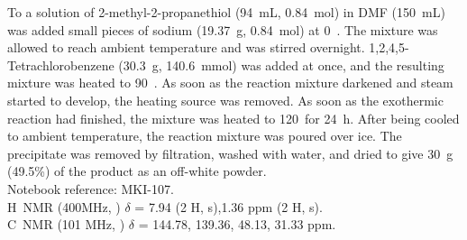 To a solution of 2-methyl-2-propanethiol (94~mL, 0.84~mol) in DMF (150~mL) was added small pieces of sodium (19.37~g, 0.84~mol) at 0~\degc. The mixture was allowed to reach ambient temperature and was stirred overnight. 1,2,4,5-Tetrachlorobenzene (30.3~g, 140.6~mmol) was added at once, and the resulting mixture was heated to 90~\degc.
As soon as the reaction mixture darkened and steam started to develop, the heating source was removed.
As soon as the exothermic reaction had finished, the mixture was heated to 120~\degc for 24~h. 
After being cooled to ambient temperature, the reaction mixture was poured over ice. The precipitate was removed by filtration, washed with water, and dried to give 30~g (49.5\%) of the product as an off-white powder.\\

\noindent
Notebook reference: MKI-107.\\

\noindent
{}H~NMR (400MHz, ) $\delta$ = 7.94 (2 H, s),1.36 ppm (2 H, s).\\

\noindent
{}C~NMR (101 MHz, ) $\delta$ = 144.78, 139.36, 48.13, 31.33 ppm.
